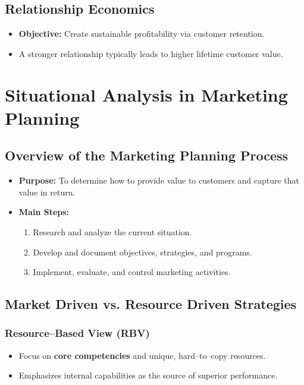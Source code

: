 \documentclass[12pt,a4paper]{report}
\begin{document}
\section{Relationship Economics}
\begin{itemize}
    \item \textbf{Objective:} Create sustainable profitability via customer retention.
    \item A stronger relationship typically leads to higher lifetime customer value.
\end{itemize}

\chapter{Situational Analysis in Marketing Planning}

\section{Overview of the Marketing Planning Process}
\begin{itemize}
    \item \textbf{Purpose:} To determine how to provide value to customers and capture that value in return.
    \item \textbf{Main Steps:}
    \begin{enumerate}[label=\arabic*.]
         \item Research and analyze the current situation.
         \item Develop and document objectives, strategies, and programs.
         \item Implement, evaluate, and control marketing activities.
    \end{enumerate}
\end{itemize}

\section{Market Driven vs. Resource Driven Strategies}
\subsection{Resource--Based View (RBV)}
\begin{itemize}
    \item Focus on \textbf{core competencies} and unique, hard--to--copy resources.
    \item Emphasizes internal capabilities as the source of superior performance.
\end{itemize}
\end{document}
